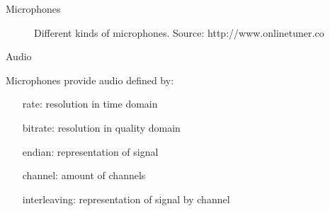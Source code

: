 \documentclass{beamer}
\begin{document}
	\begin{frame}{Microphones}
		\begin{figure}[ht]
			\centering
			\caption{Different kinds of microphones. Source: http://www.onlinetuner.co}
		\end{figure}
	\end{frame}
	
	\begin{frame}{Audio}
		
		\begin{alertblock}{Microphones provide audio defined by:}
			\begin{itemize}[leftmargin=*,labelindent=50pt]
				\item[rate:] resolution in time domain
				\item[bitrate:] resolution in quality domain
				\item[endian:] representation of signal
				\item[channel:] amount of channels 
				\item[interleaving:] representation of signal by channel
			\end{itemize}
		\end{alertblock}
	\end{frame}
	
\end{document}
